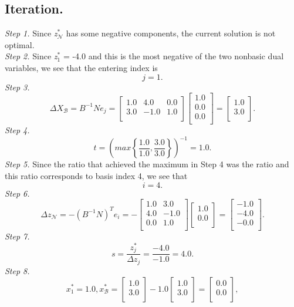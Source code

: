 \documentclass [12pt] {article}
\begin{document}
\subsection{  Iteration.}
\textit{Step 1. } Since \textit{z}$^*_{\mathcal N}$ has some negative components, the current solution is not optimal.\\
\textit{Step 2. } Since \textit{z}$^*_1$ = -4.0 and this is the most negative of the two nonbasic dual variables, we see that the entering index is
\[
j = 1.
\]
\textit{Step 3. }
\[
\Delta X_{\mathcal B} = B^{-1} N e_j = \begin{bmatrix} 1.0 & 4.0 & 0.0 \\ 3.0 & -1.0 & 1.0 \\ \end{bmatrix}
\begin{bmatrix} 1.0 \\ 0.0 \\ 0.0 \\ \end{bmatrix}
= \begin{bmatrix} 1.0 \\ 3.0 \\ \end{bmatrix}
.
\]
\textit{Step 4. }
\[
t = \left ( max \left \{ \frac{1.0}{1.0} , \frac{3.0}{3.0} \right \} \right )^{-1}   = 1.0.
\]\textit{Step 5.} Since the ratio that achieved the maximum in Step 4 was the  ratio and this ratio corresponds to basis index 4, we see that
\[
i = 4.
\]
\textit{Step 6. } 
\[
\Delta z_{\mathcal N} = -\left (B^{-1} N \right )^T e_i = - \begin{bmatrix} 1.0 & 3.0 \\ 4.0 & -1.0 \\ 0.0 & 1.0 \\ \end{bmatrix}
\begin{bmatrix} 1.0 \\ 0.0 \\ \end{bmatrix}
= \begin{bmatrix} -1.0 \\ -4.0 \\ -0.0 \\ \end{bmatrix}.
\]
\textit{Step 7. } 
\[
s =  \frac{z^*_j}{\Delta z_j} = \frac{ -4.0 }{ -1.0 } = 4.0.
\]
\textit{Step 8.}
\[
x^*_1 = 1.0,        x^*_{\mathcal B} = 
\begin{bmatrix} 1.0 \\ 3.0 \\ \end{bmatrix} - 1.0 \begin{bmatrix} 1.0 \\ 3.0 \\ \end{bmatrix} = \begin{bmatrix} 0.0 \\ 0.0 \\ \end{bmatrix} ,
\]
\end{document}
